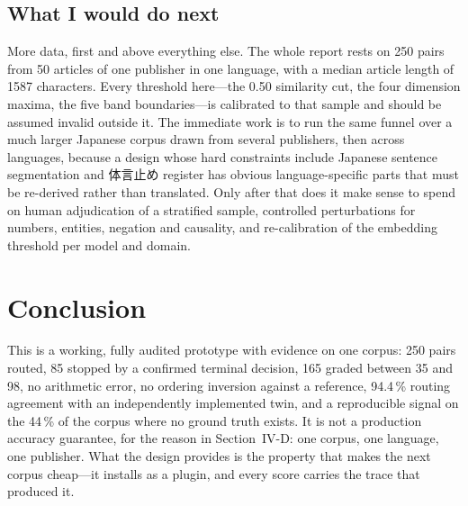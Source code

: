 \documentclass[conference]{IEEEtran}
\begin{document}
\subsection{What I would do next}
More data, first and above everything else. The whole report rests on
250 pairs from 50 articles of one publisher in one language, with a
median article length of 1587 characters. Every threshold here---the
0.50 similarity cut, the four dimension maxima, the five band
boundaries---is calibrated to that sample and should be assumed invalid
outside it. The immediate work is to run the same funnel over a much
larger Japanese corpus drawn from several publishers, then across
languages, because a design whose hard constraints include Japanese
sentence segmentation and \mbox{体言止め} register has obvious
language-specific parts that must be re-derived rather than translated.
Only after that does it make sense to spend on human adjudication of a
stratified sample, controlled perturbations for numbers, entities,
negation and causality, and re-calibration of the embedding threshold
per model and domain.

\section{Conclusion}
This is a working, fully audited prototype with evidence on one corpus:
250 pairs routed, 85 stopped by a confirmed terminal decision, 165
graded between 35 and 98, no arithmetic error, no ordering inversion
against a reference, 94.4\,\% routing agreement with an independently
implemented twin, and a reproducible signal on the 44\,\% of the corpus
where no ground truth exists. It is not a production accuracy guarantee,
for the reason in Section~IV-D: one corpus, one language, one publisher.
What the design provides is the property that makes the next corpus
cheap---it installs as a plugin, and every score carries the trace that
produced it.

\balance
\end{document}
